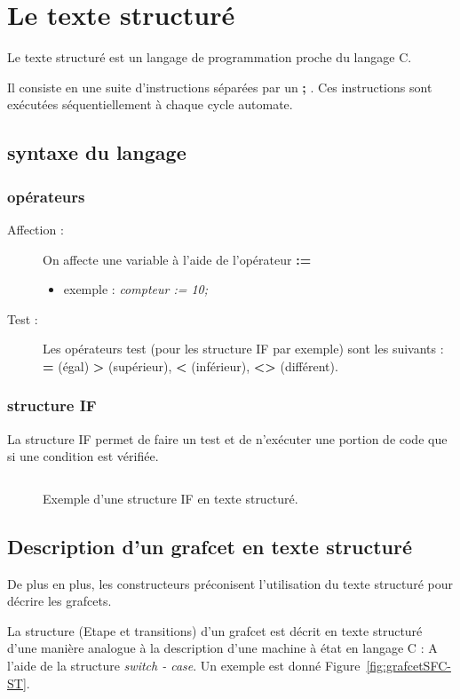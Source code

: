 \section{Le texte structuré}
Le texte structuré est un langage de programmation proche du langage C.

Il consiste en une suite d'instructions séparées par un \textbf{;} . Ces instructions sont exécutées séquentiellement à chaque cycle automate.

\subsection{syntaxe du langage}
\subsubsection{opérateurs}
\begin{description}
  \item [Affection : ] On affecte une variable à l'aide de l'opérateur \textbf{:=}
    \begin{itemize}
      \item exemple : \textit{compteur := 10;}
    \end{itemize}
  \item [Test : ] Les opérateurs test (pour les structure IF par exemple) sont les suivants : \textbf{=} (égal) \textbf{>} (supérieur), \textbf{<} (inférieur), \textbf{<>} (différent).
\end{description}

\subsubsection{structure IF}
La structure IF permet de faire un test et de n'exécuter une portion de code que si une condition est vérifiée.
\begin{figure}[ht]
  \inputminted{C}{texteStructure/structureIF.c}
  \caption{Exemple d'une structure IF en texte structuré.}
\end{figure}

\subsection{Description d'un grafcet en texte structuré}

De plus en plus, les constructeurs préconisent l'utilisation du texte structuré pour décrire les grafcets.

La structure (Etape et transitions) d'un grafcet est décrit en texte structuré d'une manière analogue à la description d'une machine à état en langage C : A l'aide de la structure \textit{switch - case}. Un exemple est donné Figure~\ref{fig:grafcetSFC-ST}.

